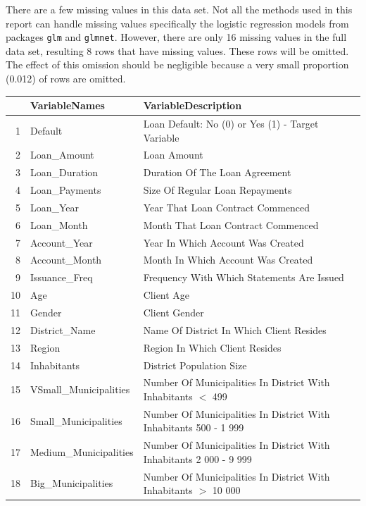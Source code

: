 \documentclass[11pt,preprint, authoryear]{elsarticle}
\numberwithin{equation}{section}
\numberwithin{figure}{section}
\numberwithin{table}{section}
\begin{document}
There are a few missing values in this data set. Not all the methods
used in this report can handle missing values \textemdash specifically
the logistic regression models from packages \texttt{glm} and
\texttt{glmnet}. However, there are only 16 missing values in the full
data set, resulting 8 rows that have missing values. These rows will be
omitted. The effect of this omission should be negligible because a very
small proportion (0.012) of rows are omitted.

\newpage

\begin{longtable}{rll}
  \hline
 & VariableNames & VariableDescription \\ 
  \hline
1 & Default & Loan Default: No (0) or Yes (1) - Target Variable \\ 
  2 & Loan\_Amount & Loan Amount \\ 
  3 & Loan\_Duration & Duration Of The Loan Agreement \\ 
  4 & Loan\_Payments & Size Of Regular Loan Repayments \\ 
  5 & Loan\_Year & Year That Loan Contract Commenced \\ 
  6 & Loan\_Month & Month That Loan Contract Commenced \\ 
  7 & Account\_Year & Year In Which Account Was Created \\ 
  8 & Account\_Month & Month In Which Account Was Created \\ 
  9 & Issuance\_Freq & Frequency With Which Statements Are Issued \\ 
  10 & Age & Client Age \\ 
  11 & Gender & Client Gender \\ 
  12 & District\_Name & Name Of District In Which Client Resides \\ 
  13 & Region & Region In Which Client Resides \\ 
  14 & Inhabitants & District Population Size \\ 
  15 & VSmall\_Municipalities & Number Of Municipalities In District With Inhabitants $<$ 499 \\ 
  16 & Small\_Municipalities & Number Of Municipalities In District With Inhabitants 500 - 1 999 \\ 
  17 & Medium\_Municipalities & Number Of Municipalities In District With Inhabitants 2 000 - 9 999 \\ 
  18 & Big\_Municipalities & Number Of Municipalities In District With Inhabitants $>$ 10 000 \\ 

\end{longtable}
\end{document}
